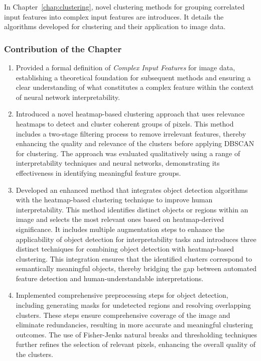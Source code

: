 In Chapter~\ref{chap:clustering}, novel clustering methods for grouping correlated input features into complex input features are introduces. It details the algorithms developed for clustering and their application to image data.

\subsubsection*{Contribution of the Chapter}

\begin{enumerate}
\item Provided a formal definition of \emph{Complex Input Features} for image data, establishing a theoretical foundation for subsequent methods and ensuring a clear understanding of what constitutes a complex feature within the context of neural network interpretability.
\item Introduced a novel heatmap-based clustering approach that uses relevance heatmaps to detect and cluster coherent groups of pixels. This method includes a two-stage filtering process to remove irrelevant features, thereby enhancing the quality and relevance of the clusters before applying DBSCAN for clustering. The approach was evaluated qualitatively using a range of interpretability techniques and neural networks, demonstrating its effectiveness in identifying meaningful feature groups.
\item Developed an enhanced method that integrates object detection algorithms with the heatmap-based clustering technique to improve human interpretability. This method identifies distinct objects or regions within an image and selects the most relevant ones based on heatmap-derived significance. It includes multiple augmentation steps to enhance the applicability of object detection for interpretability tasks and introduces three distinct techniques for combining object detection with heatmap-based clustering. This integration ensures that the identified clusters correspond to semantically meaningful objects, thereby bridging the gap between automated feature detection and human-understandable interpretations.
\item Implemented comprehensive preprocessing steps for object detection, including generating masks for undetected regions and resolving overlapping clusters. These steps ensure comprehensive coverage of the image and eliminate redundancies, resulting in more accurate and meaningful clustering outcomes. The use of Fisher-Jenks natural breaks and thresholding techniques further refines the selection of relevant pixels, enhancing the overall quality of the clusters.
 

\end{enumerate}
